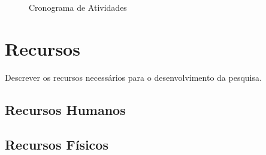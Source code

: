 \begin{figure}
	\caption{Cronograma de Atividades}\label{fig:cronograma}
	\begin{gantt}{10}{12}
		\begin{ganttitle}
		\end{ganttitle}
	\end{gantt}
	
\end{figure}
\section{Recursos}
Descrever os recursos necessários para o desenvolvimento da pesquisa.
\subsection{Recursos Humanos}
\subsection{Recursos Físicos}
